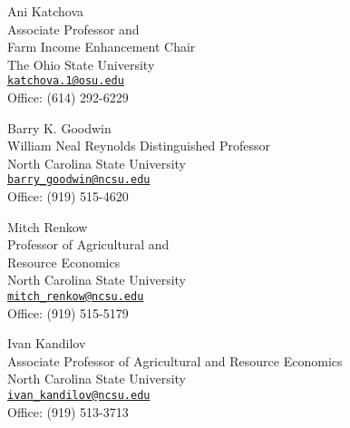 \documentclass[letterpaper]{article}
\renewenvironment{itemize}{
  \begin{list}{}{
    \setlength{\leftmargin}{1.5em}
  }
}{
  \end{list}
}
\begin{document}
\begin{multicols}{2}
\begin{itemize}
\item Ani Katchova \\ Associate Professor and \\ Farm Income Enhancement Chair \\ The Ohio State University \\ \href{mailto:katchova.1@osu.edu}{\tt katchova.1@osu.edu} \\ Office: (614) 292-6229
\item Barry K. Goodwin \\ William Neal Reynolds Distinguished Professor \\ North Carolina State University \\ \href{mailto:barry\_goodwin@ncsu.edu}{\tt barry\_goodwin@ncsu.edu} \\ Office: (919) 515-4620

\item Mitch Renkow \\ Professor of Agricultural and \\ Resource Economics \\ North Carolina State University \\ \href{mailto:mitch\_renkow@ncsu.edu}{\tt mitch\_renkow@ncsu.edu} \\ Office: (919) 515-5179
\item Ivan Kandilov \\ Associate Professor of Agricultural and Resource Economics \\ North Carolina State University \\ \href{mailto:ivan\_kandilov@ncsu.edu}{\tt ivan\_kandilov@ncsu.edu} \\ Office: (919) 513-3713
\end{itemize}
\end{multicols}
\end{document}
